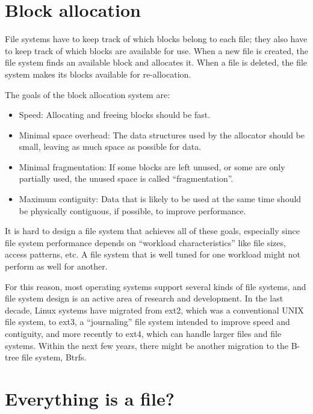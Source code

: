 \documentclass[12pt]{book}
\begin{document}
{\section{Block allocation}

File systems have to keep track of which blocks belong to each file;
they also have to keep track of which blocks are available for use.
When a new file is created, the file system finds an available
block and allocates it.  When a file is deleted, the file system
makes its blocks available for re-allocation.

The goals of the block allocation system are:

\begin{itemize}

\item Speed: Allocating and freeing blocks should be fast.

\item Minimal space overhead: The data structures used by the allocator
  should be small, leaving as much space as possible for data.

\item Minimal fragmentation: If some blocks are left unused, or some
  are only partially used, the unused space is called
  ``fragmentation''.

\item Maximum contiguity: Data that is likely to be used at the same
  time should be physically contiguous, if possible, to improve
  performance.

\end{itemize}

It is hard to design a file system that achieves all of these
goals, especially since file system performance depends on
``workload characteristics'' like file sizes, access
patterns, etc.  A file system that is well tuned for one workload
might not perform as well for another.

For this reason, most operating systems support several kinds of file
systems, and file system design is an active area of research and
development.  In the last decade, Linux systems have migrated
from ext2, which was a conventional UNIX file system, to ext3,
a ``journaling'' file system intended to improve speed and
contiguity, and more recently to ext4, which can handle larger files
and file systems.  Within the next few years, there might be
another migration to the B-tree file system, Btrfs.


\section{Everything is a file?}

}
\end{document}
